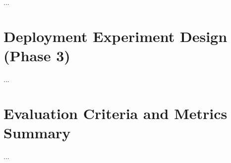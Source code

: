 ...


\section{Deployment Experiment Design (Phase 3)}
\label{sec:deployment_methodology}

...


\section{Evaluation Criteria and Metrics Summary}
\label{sec:evaluation_criteria}

...
